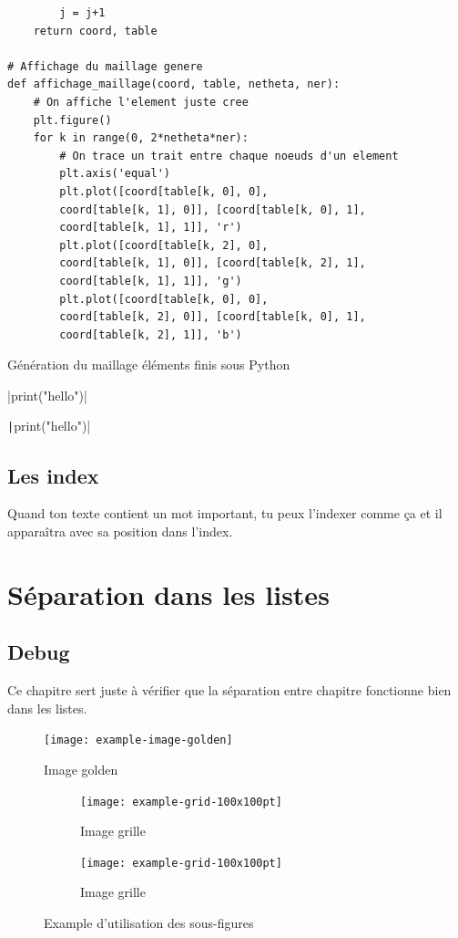 \documentclass[a4paper,11pt]{report}    %
\newenvironment{longlisting}{\captionsetup{type=listing}}{} %
\begin{document}
\begin{longlisting}
\begin{verbatim}
        j = j+1
    return coord, table

# Affichage du maillage genere
def affichage_maillage(coord, table, netheta, ner):
    # On affiche l'element juste cree
    plt.figure()
    for k in range(0, 2*netheta*ner):
        # On trace un trait entre chaque noeuds d'un element
        plt.axis('equal')
        plt.plot([coord[table[k, 0], 0], 
        coord[table[k, 1], 0]], [coord[table[k, 0], 1], 
        coord[table[k, 1], 1]], 'r')
        plt.plot([coord[table[k, 2], 0], 
        coord[table[k, 1], 0]], [coord[table[k, 2], 1], 
        coord[table[k, 1], 1]], 'g')
        plt.plot([coord[table[k, 0], 0], 
        coord[table[k, 2], 0]], [coord[table[k, 0], 1], 
        coord[table[k, 2], 1]], 'b')
\end{verbatim}
\caption{Génération du maillage éléments finis sous Python}
\label{lst:PT_Mesh.py}
\end{longlisting}

|print("hello")| %

\texttt|print("hello")|   %

\section{Les index}

Quand ton texte contient un mot important, tu peux l'indexer comme ça et il apparaîtra avec sa position dans l'index.

\chapter{Séparation dans les listes}

\section{Debug}

Ce chapitre sert juste à vérifier que la séparation entre chapitre fonctionne bien dans les listes.

\begin{figure}[H]
    \centering
    \texttt{[image: example-image-golden]}
    \caption{Image golden}
    \label{fig:example-image-golden}
\end{figure}

\begin{figure}[H]
    \begin{subfigure}[t]{0.475\textwidth}
        \texttt{[image: example-grid-100x100pt]}
        \caption{Image grille}
        \label{subfig:example-grid}
    \end{subfigure}%
    \hfill
    \begin{subfigure}[t]{0.475\textwidth}
        \texttt{[image: example-grid-100x100pt]}
        \caption{Image grille}
        \label{subfig:example-grid_bis}
    \end{subfigure}
    \caption{Example d'utilisation des sous-figures}
    \label{fig:test_subfigure_bis}
\end{figure}
\end{document}
